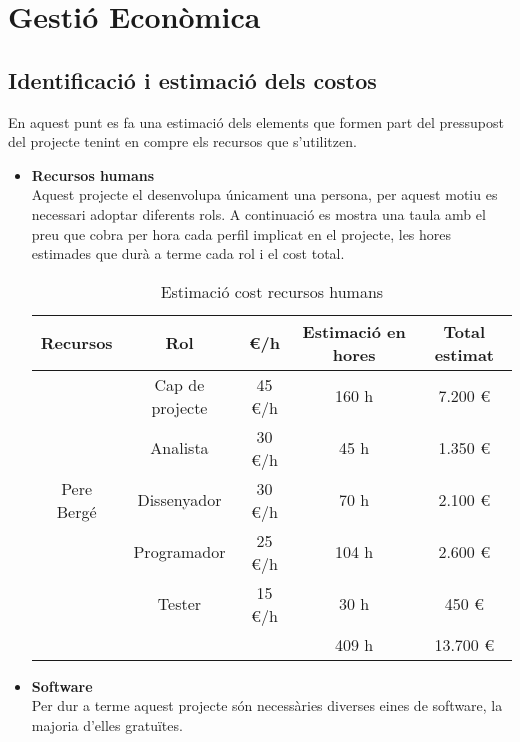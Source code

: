 
\chapter{Gestió Econòmica} %

\label{GestioEconomica} %

\section{Identificació i estimació dels costos}
En aquest punt es fa una estimació dels elements que formen part del pressupost del projecte tenint en compre els recursos que s’utilitzen.

\begin{itemize}
\item{}\textbf{Recursos humans}\\
Aquest projecte el desenvolupa únicament una persona, per aquest motiu
es necessari adoptar diferents rols. A continuació es mostra una taula amb
el preu que cobra per hora cada perfil implicat en el projecte, les hores
estimades que durà a terme cada rol i el cost total.



\begin{table}[!h]
\centering
\begin{tabular}{|c|c|c|c|c|}
\hline
\textbf{Recursos}  & \textbf{Rol} & \textbf{\euro/h} & \textbf{Estimació en hores} & \textbf{Total estimat} \\ \hline
 & Cap de projecte & 45 \euro/h & 160 h & 7.200 \euro \\ \cline {2-5}
\multicolumn{ 1}{|l|}{} & Analista & 30 \euro/h & 45 h & 1.350 \euro \\ \cline{ 2- 5}
Pere Bergé & Dissenyador & 30 \euro/h & 70 h & 2.100 \euro \\ \cline{ 2- 5}
\multicolumn{ 1}{|l|}{} & Programador & 25 \euro/h & 104 h & 2.600 \euro \\ \cline{ 2- 5}
\multicolumn{ 1}{|l|}{} & Tester & 15 \euro/h & 30 h & 450 \euro \\ \hline
\multicolumn{ 1}{|l|}{} &   &  & 409 h & 13.700 \euro \\ \hline
\end{tabular}
\label{}
\caption{Estimació cost recursos humans}
\end{table}

\item{}\textbf{Software}\\
Per dur a terme aquest projecte són necessàries diverses eines de software,
la majoria d’elles gratuïtes.


\end{itemize}
